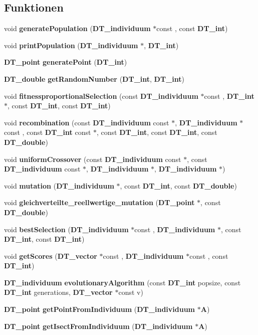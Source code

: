 \subsection*{Funktionen}
\begin{DoxyCompactItemize}
\item 
void {\bf generatePopulation} ({\bf DT\_\-individuum} $\ast$const , const {\bf DT\_\-int})
\item 
void {\bf printPopulation} ({\bf DT\_\-individuum} $\ast$, {\bf DT\_\-int})
\item 
{\bf DT\_\-point} {\bf generatePoint} ({\bf DT\_\-int})
\item 
{\bf DT\_\-double} {\bf getRandomNumber} ({\bf DT\_\-int}, {\bf DT\_\-int})
\item 
void {\bf fitnessproportionalSelection} (const {\bf DT\_\-individuum} $\ast$const , {\bf DT\_\-int} $\ast$, const {\bf DT\_\-int}, const {\bf DT\_\-int})
\item 
void {\bf recombination} (const {\bf DT\_\-individuum} const $\ast$, {\bf DT\_\-individuum} $\ast$const , const {\bf DT\_\-int} const $\ast$, const {\bf DT\_\-int}, const {\bf DT\_\-int}, const {\bf DT\_\-double})
\item 
void {\bf uniformCrossover} (const {\bf DT\_\-individuum} const $\ast$, const {\bf DT\_\-individuum} const $\ast$, {\bf DT\_\-individuum} $\ast$, {\bf DT\_\-individuum} $\ast$)
\item 
void {\bf mutation} ({\bf DT\_\-individuum} $\ast$, const {\bf DT\_\-int}, const {\bf DT\_\-double})
\item 
void {\bf gleichverteilte\_\-reellwertige\_\-mutation} ({\bf DT\_\-point} $\ast$, const {\bf DT\_\-double})
\item 
void {\bf bestSelection} ({\bf DT\_\-individuum} $\ast$const , {\bf DT\_\-individuum} $\ast$, const {\bf DT\_\-int}, const {\bf DT\_\-int})
\item 
void {\bf getScores} ({\bf DT\_\-vector} $\ast$const , {\bf DT\_\-individuum} $\ast$const , const {\bf DT\_\-int})
\item 
{\bf DT\_\-individuum} {\bf evolutionaryAlgorithm} (const {\bf DT\_\-int} popsize, const {\bf DT\_\-int} generations, {\bf DT\_\-vector} $\ast$const v)
\item 
{\bf DT\_\-point} {\bf getPointFromIndividuum} ({\bf DT\_\-individuum} $\ast${\bf A})
\item 
{\bf DT\_\-point} {\bf getIsectFromIndividuum} ({\bf DT\_\-individuum} $\ast${\bf A})
\end{DoxyCompactItemize}


